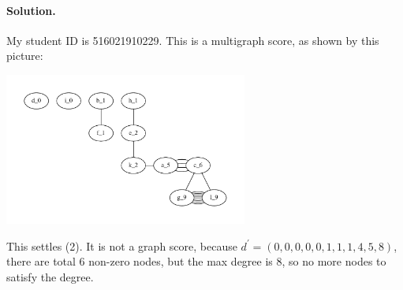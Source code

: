 \paragraph{Solution.} My student ID is 516021910229. 
This is a multigraph score, as shown by this picture:
\begin{center}
\includegraphics[width=0.6\textwidth]{figures/graph-516021910229.pdf}
\end{center}
This settles (2). It is not a graph score, because $d^\prime = (0,0,0,0,0,1,1,1,4,5,8)$, there are total 6 non-zero nodes, but the max degree is 8, so no more nodes to satisfy the degree.
